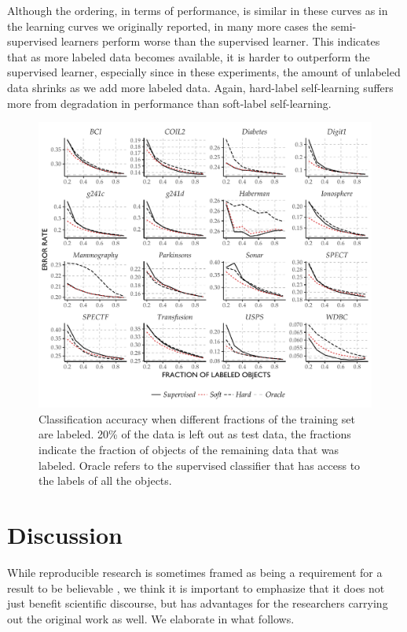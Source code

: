 \documentclass[twoside]{memoir}\usepackage[]{graphicx}\usepackage{xcolor}
\makeatletter
\def\maxwidth{ %
  \ifdim\Gin@nat@width>\linewidth
    \linewidth
  \else
    \Gin@nat@width
  \fi
}
\newenvironment{knitrout}{}{} %
\makeatother
\begin{document}
Although the ordering, in terms of performance, is similar in these curves as in the learning curves we originally reported, in many more cases the semi-supervised learners perform worse than the supervised learner. This indicates that as more labeled data becomes available, it is harder to outperform the supervised learner, especially since in these experiments, the amount of unlabeled data shrinks as we add more labeled data. Again, hard-label self-learning suffers more from degradation in performance than soft-label self-learning.

\begin{knitrout}
\color{fgcolor}\begin{figure}
\includegraphics[width=\maxwidth]{figure/learningcurves-frac-1} \caption[Classification accuracy when different fractions of the training set are labeled]{Classification accuracy when different fractions of the training set are labeled. 20\% of the data is left out as test data, the fractions indicate the fraction of objects of the remaining data that was labeled. Oracle refers to the supervised classifier that has access to the labels of all the objects.}\label{fig:learningcurves-frac}
\end{figure}


\end{knitrout}

\section{Discussion}
While reproducible research is sometimes framed as being a requirement for a result to be believable \citep{Goodman2016a,Donoho2009}, we think it is important to emphasize that it does not just benefit scientific discourse, but has advantages for the researchers carrying out the original work as well. We elaborate in what follows.
\end{document}
